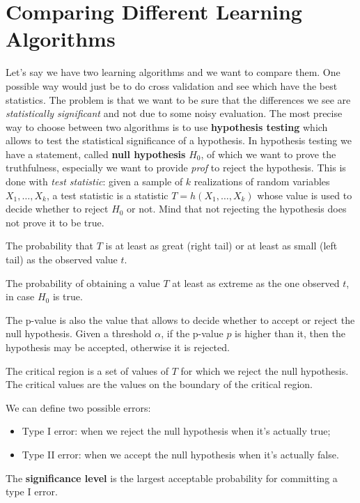 \section{Comparing Different Learning Algorithms}
Let's say we have two learning algorithms and we want to compare them. One possible way would just be to do cross validation and see which have the best statistics. The problem is that we want to be sure that the differences we see are \textit{statistically significant} and not due to some noisy evaluation. \newline
The most precise way to choose between two algorithms is to use \textbf{hypothesis testing} which allows to test the statistical significance of a hypothesis.\newline
In hypothesis testing we have a statement, called \textbf{null hypothesis} $H_0$, of which we want to prove the truthfulness, especially we want to provide \textit{prof} to reject the hypothesis. This is done with \textit{test statistic}: given a sample of $k$ realizations of random variables $X_1,\hdots,X_k$, a test statistic is a statistic $T=h(X_1,\hdots,X_k)$ whose value is used to decide whether to reject $H_0$ or not. Mind that not rejecting the hypothesis does not prove it to be true. \newline
\begin{definition}
  The probability that $T$ is at least as great (right tail) or at least as small (left tail) as the observed value $t$.
\end{definition}
\begin{definition}[p-Value]
  The probability of obtaining a value $T$ at least as extreme as the one observed $t$, in case $H_0$ is true.
\end{definition}
The p-value is also the value that allows to decide whether to accept or reject the null hypothesis. Given a threshold $\alpha$, if the p-value $p$ is higher than it, then the hypothesis may be accepted, otherwise it is rejected.  
\begin{definition}
  The critical region is a set of values of $T$ for which we reject the null hypothesis. The critical values are the values on the boundary of the critical region. 
\end{definition}
We can define two possible errors:
\begin{itemize}
  \item Type I error: when we reject the null hypothesis when it's actually true;
  \item Type II error: when we accept the null hypothesis when it's actually false.
\end{itemize}
The \textbf{significance level} is the largest acceptable probability for committing a type I error. 
%
%
